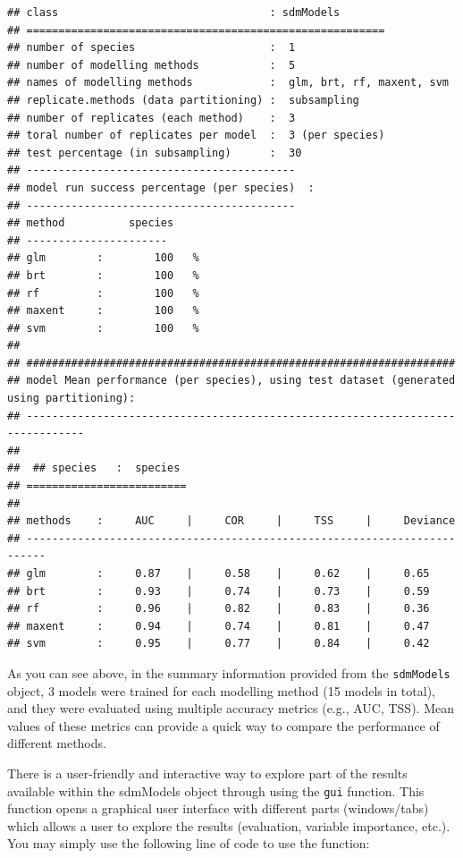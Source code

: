 \documentclass[
]{article}
\begin{document}
\begin{verbatim}
## class                                 : sdmModels 
## ======================================================== 
## number of species                     :  1 
## number of modelling methods           :  5 
## names of modelling methods            :  glm, brt, rf, maxent, svm 
## replicate.methods (data partitioning) :  subsampling 
## number of replicates (each method)    :  3 
## toral number of replicates per model  :  3 (per species) 
## test percentage (in subsampling)      :  30 
## ------------------------------------------
## model run success percentage (per species)  :
## ------------------------------------------
## method          species          
## ---------------------- 
## glm        :        100   %
## brt        :        100   %
## rf         :        100   %
## maxent     :        100   %
## svm        :        100   %
## 
## ###################################################################
## model Mean performance (per species), using test dataset (generated using partitioning):
## -------------------------------------------------------------------------------
## 
##  ## species   :  species 
## =========================
## 
## methods    :     AUC     |     COR     |     TSS     |     Deviance 
## -------------------------------------------------------------------------
## glm        :     0.87    |     0.58    |     0.62    |     0.65     
## brt        :     0.93    |     0.74    |     0.73    |     0.59     
## rf         :     0.96    |     0.82    |     0.83    |     0.36     
## maxent     :     0.94    |     0.74    |     0.81    |     0.47     
## svm        :     0.95    |     0.77    |     0.84    |     0.42
\end{verbatim}

As you can see above, in the summary information provided from the
\texttt{sdmModels} object, 3 models were trained for each modelling
method (15 models in total), and they were evaluated using multiple
accuracy metrics (e.g., AUC, TSS). Mean values of these metrics can
provide a quick way to compare the performance of different methods.

There is a user-friendly and interactive way to explore part of the
results available within the sdmModels object through using the
\texttt{gui} function. This function opens a graphical user interface
with different parts (windows/tabs) which allows a user to explore the
results (evaluation, variable importance, etc.). You may simply use the
following line of code to use the function:
\end{document}
